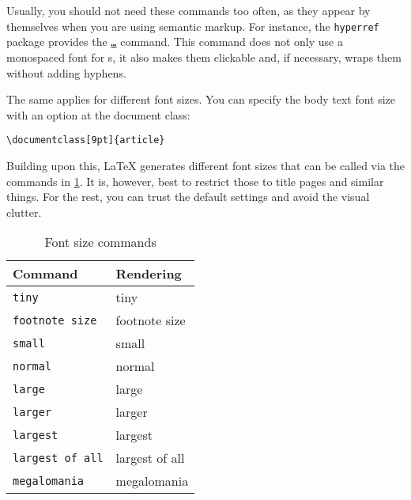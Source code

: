 Usually, you should not need these commands too often, as they appear by themselves when you are using semantic markup.
For instance, the \texttt{hyperref} package provides the \texttt{\url{…}} command.
This command does not only use a monospaced font for s, it also makes them clickable and, if necessary, wraps them without adding hyphens.

The same applies for different font sizes.
You can specify the body text font size with an option at the document class:
\begin{verbatim}
\documentclass[9pt]{article}
\end{verbatim}
Building upon this, \LaTeX{} generates different font sizes that can be called via the commands in \cref{tbl:type-sizes}.
It is, however, best to restrict those to title pages and similar things.
For the rest, you can trust the default settings and avoid the visual clutter.

\begin{table}[H]
	\center
	\begin{tabular}{ll}
		\toprule
		Command & Rendering \\
		\midrule
		\texttt{{\tiny tiny}} & {\tiny tiny} \\
		\texttt{{\footnotesize footnote size}} & {\footnotesize footnote size} \\
		\texttt{{\small small}} & {\small small} \\
		\texttt{{\normalsize normal}} & {\normalsize normal} \\
		\texttt{{\large large}} & {\large large} \\
		\texttt{{\Large larger}} & {\Large larger} \\
		\texttt{{\LARGE largest}} & {\LARGE largest} \\
		\texttt{{\huge largest of all}} & {\huge largest of all} \\
		\texttt{{\Huge megalomania}} & {\Huge megalomania} \\
		\bottomrule
	\end{tabular}
	\caption{Font size commands}
	\label{tbl:type-sizes}
\end{table}


